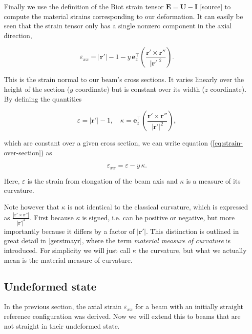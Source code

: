 Finally we use the definition of the Biot strain tensor $\boldsymbol{E} = \boldsymbol{U} - \boldsymbol{I}$ [source] to compute the material strains corresponding to our deformation.
It can easily be seen that the strain tensor only has a single nonzero component in the axial direction,

\begin{equation}
\varepsilon_{xx} = |\boldsymbol{r}'| - 1 - y\,\boldsymbol{e}_{z}^\intercal\left(\frac{\boldsymbol{r}' \times \boldsymbol{r}''}{|\boldsymbol{r}'|^2}\right). \label{eq:strain-over-section}
\end{equation}

This is the strain normal to our beam's cross sections.
It varies linearly over the height of the section ($y$ coordinate) but is constant over its width ($z$ coordinate).
By defining the quantities

\begin{equation}
\varepsilon = |\boldsymbol{r}'| - 1, \quad \kappa = \boldsymbol{e}_{z}^\intercal\left(\frac{\boldsymbol{r}' \times \boldsymbol{r}''}{|\boldsymbol{r}'|^2}\right),
\end{equation}

which are constant over a given cross section, we can write equation (\ref{eq:strain-over-section}) as

\begin{equation}
\varepsilon_{xx} = \varepsilon - y\,\kappa. \label{eq:strain-over-section}
\end{equation}

Here, $\varepsilon$ is the strain from elongation of the beam axis and $\kappa$ is a measure of its curvature.

Note however that $\kappa$ is not identical to the classical curvature, which is expressed as $\frac{|\boldsymbol{r}' \times \boldsymbol{r}''|}{|\boldsymbol{r}'|^3}$.
First because $\kappa$ is signed, i.e. can be positive or negative, but more importantly because it differs by a factor of $|\boldsymbol{r}'|$.
This distinction is outlined in great detail in [gerstmayr], where the term \textit{material measure of curvature} is introduced.
For simplicity we will just call $\kappa$ the curvature, but what we actually mean is the material measure of curvature.

\subsection{Undeformed state}

In the previous section, the axial strain $\varepsilon_{xx}$ for a beam with an initially straight reference configuration was derived.
Now we will extend this to beams that are not straight in their undeformed state.

